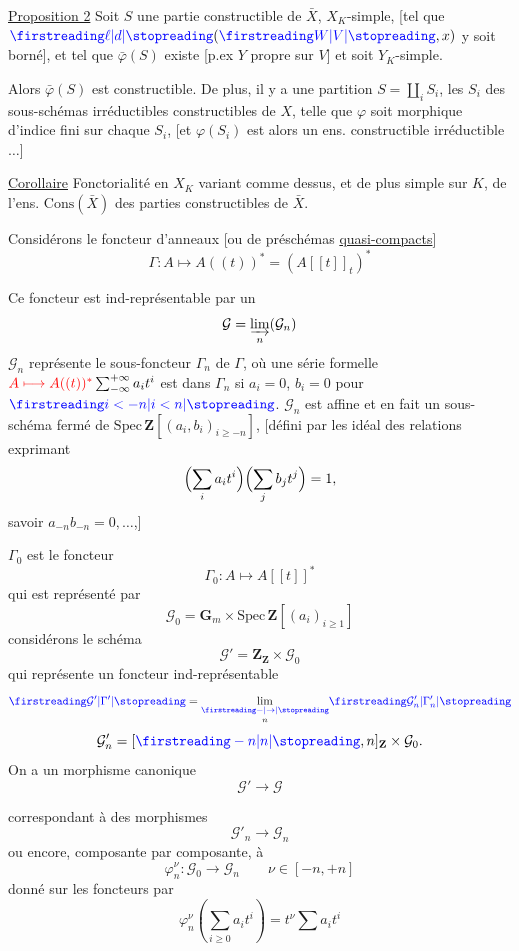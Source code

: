 \uline{Proposition 2} Soit $S$ une partie constructible de $\bar X$, $X_K$-simple, [tel que $\unsure{\ell|d}(\unsure{W|V},x)$ y soit borné], et tel que $\bar\varphi(S)$ existe [p.ex $Y$ propre sur $V$] et soit $Y_K$-simple.

Alors $\bar\varphi(S)$ est constructible. De plus, il y a une partition  $S=\coprod_i S_i$, les $S_i$ des sous-schémas irréductibles constructibles de $X$, telle que $\varphi$ soit morphique d'indice fini sur chaque $S_i$, [et $\varphi(S_i)$ est alors un ens. constructible irréductible $\ldots$]

\uline{Corollaire} Fonctorialité en $X_K$ variant comme dessus, et de plus simple sur $K$, de l'ens. $\mathrm{Cons}(\bar X)$ des parties constructibles de $\bar X$.

Considérons le foncteur d'anneaux [ou de préschémas \uline{quasi-compacts}]
\[
\Gamma:A\longmapsto A((t))^*=(A[[t]]_t)^*
\]

Ce foncteur est ind-représentable par un
\[
\mathcal G=\varinjlim_n(\mathcal G_n)
\]
$\mathcal G_n$ représente le sous-foncteur $\Gamma_n$ de $\Gamma$, où une série formelle ${\color{red}A\longmapsto A((t))^*}\sum_{-\infty}^{+\infty}a_i t^i$  est dans $\Gamma_n$ si $a_i=0$, $b_i=0$ pour $\unsure{i<-n|i<n}$. $\mathcal G_n$ est affine et en fait un sous-schéma fermé de $\mathrm{Spec}\,\mathbf Z[(a_i,b_i)_{i\geq-n}]$, [défini par les  idéal des relations exprimant
\[
\Bigl(\sum_i a_it^i\Bigr)\Bigl(\sum_j b_jt^j\Bigr)=1,
\]
savoir $a_{-n}b_{-n}=0,\ldots$,]

  $\Gamma_0$ est le foncteur
\[
\Gamma_0:A\longmapsto A[[t]]^*
\]
qui est représenté par
\[
\mathcal G_0=\mathbf G_m\times\mathrm{Spec}\,\mathbf Z[(a_i)_{i\geq1}]
\]
considérons le schéma
\[
\mathcal G'=\mathbf Z_{\mathbf Z}\times\mathcal G_0
\]
qui représente un foncteur ind-représentable
\[
\unsure{\mathcal G'|\Gamma'}=\underset{n}{\underset{\unsure{-|\rightarrow}}{\lim}}\unsure{\mathcal G'_n|\Gamma'_n}
\]
\[
\mathcal G'_n=[\unsure{-n|n},n]_{\mathbf Z}\times\mathcal G_0.
\]
On a un morphisme canonique
\[
\mathcal G'\longrightarrow\mathcal G
\]

correspondant à des morphismes
\[
\mathcal G'_n\longrightarrow\mathcal G_n
\]
ou encore, composante par composante, à
\[
\varphi_n^\nu:\mathcal G_0\longrightarrow\mathcal G_n\qquad \nu\in[-n,+n]
\]
donné  sur les foncteurs par
\[
\varphi_n^\nu\left(\sum_{i\geq0}a_it^i\right)=t^\nu\sum a_it^i
\]

